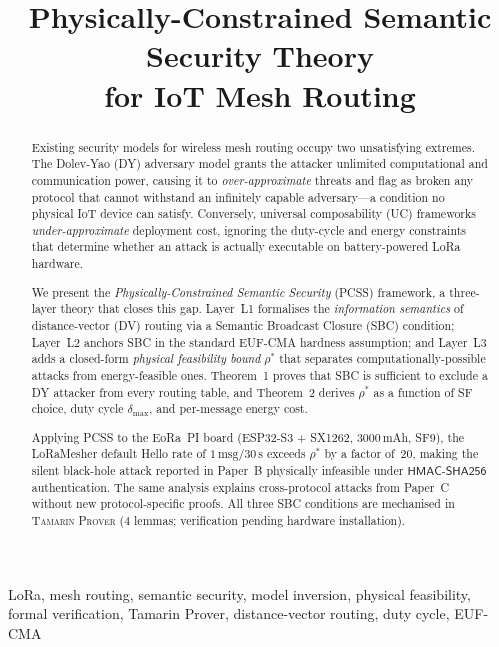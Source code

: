 \documentclass[journal,compsoc]{IEEEtran}
\title{Physically-Constrained Semantic Security Theory\\for IoT Mesh Routing}
\author{%
  \IEEEauthorblockN{[Author names redacted for review]}%
  \IEEEauthorblockA{%
    Department of Computer Science and Information Engineering\\
    National Pingtung University, Pingtung 900, Taiwan\\
    Email: augchao@gms.npu.edu.tw}%
}
\theoremstyle{plain}
\theoremstyle{definition}
\theoremstyle{remark}
\newcommand{\rhostar}{\rho^*}
\newcommand{\hmac}{\textsf{HMAC-SHA256}}
\begin{document}

\maketitle

\begin{abstract}
Existing security models for wireless mesh routing occupy two unsatisfying
extremes.  The Dolev-Yao (DY) adversary model grants the attacker unlimited
computational and communication power, causing it to \emph{over-approximate}
threats and flag as broken any protocol that cannot withstand an infinitely
capable adversary---a condition no physical IoT device can satisfy.
Conversely, universal composability (UC) frameworks \emph{under-approximate}
deployment cost, ignoring the duty-cycle and energy constraints that
determine whether an attack is actually executable on battery-powered LoRa
hardware.

We present the \emph{Physically-Constrained Semantic Security} (PCSS)
framework, a three-layer theory that closes this gap.  Layer~L1 formalises
the \emph{information semantics} of distance-vector (DV) routing via a
Semantic Broadcast Closure (SBC) condition; Layer~L2 anchors SBC in the
standard EUF-CMA hardness assumption; and Layer~L3 adds a closed-form
\emph{physical feasibility bound} $\rhostar$ that separates
computationally-possible attacks from energy-feasible ones.  Theorem~1
proves that SBC is sufficient to exclude a DY attacker from every routing
table, and Theorem~2 derives $\rhostar$ as a function of SF choice, duty
cycle $\delta_{\max}$, and per-message energy cost.

Applying PCSS to the EoRa~PI board (ESP32-S3 + SX1262, 3000\,mAh, SF9),
the LoRaMesher default Hello rate of $1\,\text{msg}/30\,\text{s}$ exceeds
$\rhostar$ by a factor of~20, making the silent black-hole attack reported
in Paper~B physically infeasible under $\hmac$ authentication.  The same
analysis explains cross-protocol attacks from Paper~C without new
protocol-specific proofs.  All three SBC conditions are mechanised in
\textsc{Tamarin Prover} (4 lemmas; verification pending hardware
installation).
\end{abstract}

\begin{IEEEkeywords}
LoRa, mesh routing, semantic security, model inversion, physical
feasibility, formal verification, Tamarin Prover, distance-vector routing,
duty cycle, EUF-CMA
\end{IEEEkeywords}
\end{document}
